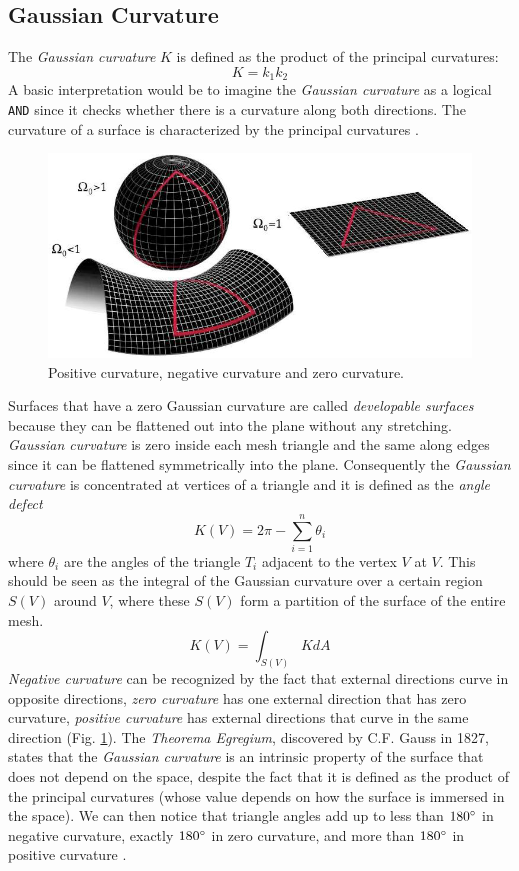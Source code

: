 \subsection{Gaussian Curvature} \label{section:gaussian-curvature-intro}
The \textit{Gaussian curvature} $K$ is defined as the product of the principal curvatures:
$$K=k_1k_2$$
A basic interpretation would be to imagine the \textit{Gaussian curvature} as a logical \texttt{AND} since it checks whether there is a curvature along both directions.
The curvature of a surface is characterized by the principal curvatures \cite{WEBSITE:gaussiancurvaturedirty}.
\begin{figure}[!h]
  \centering
\includegraphics[scale=0.5]{images/gaussian_curvature_examples.png}
\caption{Positive curvature, negative curvature and zero curvature.}\label{fig:curvature-gaussian}
\end{figure}
Surfaces that have a zero Gaussian curvature are called \textit{developable surfaces} because they can be flattened out into the plane without any stretching. \textit{Gaussian curvature} is zero inside each mesh triangle and the same along edges since it can be flattened symmetrically into the plane. Consequently the \textit{Gaussian curvature} is concentrated at vertices of a triangle and it is defined as the \textit{angle defect}
$$K(V) = 2 \pi - \sum_{i=1}^n \theta_i$$
where $\theta_i$ are the angles of the triangle $T_i$ adjacent to the vertex $V$ at $V$. This should be seen as the integral of the Gaussian curvature over a certain region $S(V)$ around $V$, where these $S(V)$ form a partition of the surface of the entire mesh.
$$ K(V) = \int_{S(V)} KdA  $$
\textit{Negative curvature} can be recognized by the fact that external directions curve in opposite directions, \textit{zero curvature} has one external direction that has zero curvature, \textit{positive curvature} has external directions that curve in the same direction (Fig. \ref{fig:curvature-gaussian}).
The \textit{Theorema Egregium}, discovered by C.F. Gauss in 1827, states that the \textit{Gaussian curvature} is an intrinsic property of the surface that does not depend on the space, despite the fact that it is defined as the product of the principal curvatures (whose value depends on how the surface is immersed in the space).
We can then notice that triangle angles add up to less than $180 \degree$ in negative curvature, exactly $180 \degree$ in zero curvature, and more than $180 \degree$ in positive curvature \cite{geometryprocessing}.

